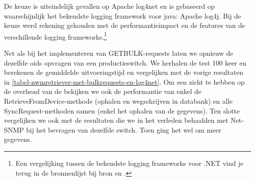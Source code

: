 De keuze is uiteindelijk gevallen op Apache log4net en is gebaseerd op waarschijnlijk het bekendste logging framework voor java: Apache log4j.
Bij de keuze werd rekening gehouden met de performantieimpact en de features van de verschillende logging frameworks.\footnote{
	Een vergelijking tussen de bekendste logging frameworks voor .NET vind je 
	terug in de bronnenlijst bij bron \cite{logging-frameworks-and-performance} en \cite{logging-frameworks}.
}


Net als bij het implementeren van GETBULK-requests laten we opnieuw de \nwmretriever{} dezelfde \glspl{oid} opvragen van een productieswitch.
We herhalen de test 100 keer en berekenen de gemiddelde uitvoeringstijd en vergelijken met de vorige resultaten
in \cref{tabel-nwmretriever-met-bulkrequests-en-log4net}.
Om een zicht te hebben op de overhead van de \nwmretriever{} bekijken we ook de performantie van enkel de RetrieveFromDevice-methode (ophalen en wegschrijven in databank) en alle SyncRequest-methoden samen (enkel het ophalen van de gegevens).
Ten slotte vergelijken we ook met de resultaten die we in het verleden behaalden met Net-SNMP bij het bevragen van dezelfde switch.
Toen ging het wel om meer gegevens.

